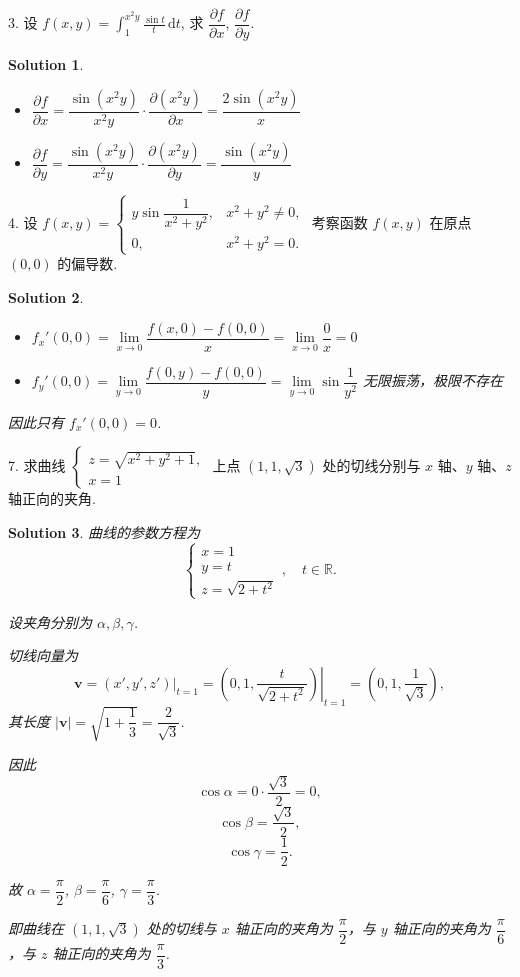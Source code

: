 \documentclass[a4paper,12pt]{article}
\newtheorem*{sol}{Solution}
\begin{document}
3. 设 $f(x,y) = \int_{1}^{x^2 y} \frac{\sin t}{t} \,\mathrm{d}t$, 求 $\dfrac{\partial f}{\partial x}$, $\dfrac{\partial f}{\partial y}$.
\begin{sol}
    \begin{itemize}
        \item $\dfrac{\partial f}{\partial x}=\dfrac{\sin (x^2 y)}{x^2 y}\cdot\dfrac{\partial (x^2y)}{\partial x}=\dfrac{2\sin (x^2 y)}{x}$
        \item $\dfrac{\partial f}{\partial y}=\dfrac{\sin (x^2 y)}{x^2 y}\cdot\dfrac{\partial (x^2y)}{\partial y}=\dfrac{\sin (x^2 y)}{y}$
    \end{itemize}
\end{sol}


4. 设 $f(x,y) =
    \begin{cases}
        y \sin \dfrac{1}{x^2 + y^2}, & x^2 + y^2 \neq 0, \\
        0,                           & x^2 + y^2 = 0.
    \end{cases}$
考察函数 $f(x,y)$ 在原点 $(0,0)$ 的偏导数.
\begin{sol}
    \begin{itemize}
        \item $f_x'(0,0)=\lim\limits_{x\to 0}\dfrac{f(x,0)-f(0,0)}{x}=\lim\limits_{x\to 0}\dfrac{0}{x}=0$
        \item $f_y'(0,0)=\lim\limits_{y\to 0}\dfrac{f(0,y)-f(0,0)}{y}=\lim\limits_{y\to 0}\sin\dfrac{1}{y^2}$ 无限振荡，极限不存在
    \end{itemize}
    
    因此只有 $f_x'(0,0)=0$.
\end{sol}


7. 求曲线
$\begin{cases}
        z = \sqrt{x^2 + y^2 + 1}, \\
        x = 1
    \end{cases}$
上点 $(1,1,\sqrt{3})$ 处的切线分别与 $x$ 轴、$y$ 轴、$z$ 轴正向的夹角.
\begin{sol}
    曲线的参数方程为
    $$\begin{cases}
        x=1 \\
        y=t \\
        z=\sqrt{2+t^2}
    \end{cases},\quad t\in\mathbb{R}.$$
    
    设夹角分别为 $\alpha,\beta,\gamma$.
    
    切线向量为
    $$\boldsymbol{v}=\left.(x',y',z')\right|_{t=1}=\left.\left(0,1,\frac{t}{\sqrt{2+t^2}}\right)\right|_{t=1}=\left(0,1,\frac{1}{\sqrt{3}}\right),$$
    其长度 $|\boldsymbol{v}|=\sqrt{1+\dfrac{1}{3}}=\dfrac{2}{\sqrt{3}}$.
    
    因此
    $$\cos\alpha=0\cdot\frac{\sqrt{3}}{2}=0,$$
    $$\cos\beta=\frac{\sqrt{3}}{2},$$
    $$\cos\gamma=\frac{1}{2}.$$
    
    故 $\alpha=\dfrac{\pi}{2}$, $\beta=\dfrac{\pi}{6}$, $\gamma=\dfrac{\pi}{3}$.
    
    即曲线在 $(1,1,\sqrt{3})$ 处的切线与 $x$ 轴正向的夹角为 $\dfrac{\pi}{2}$，与 $y$ 轴正向的夹角为 $\dfrac{\pi}{6}$，与 $z$ 轴正向的夹角为 $\dfrac{\pi}{3}$.
\end{sol}
\end{document}
